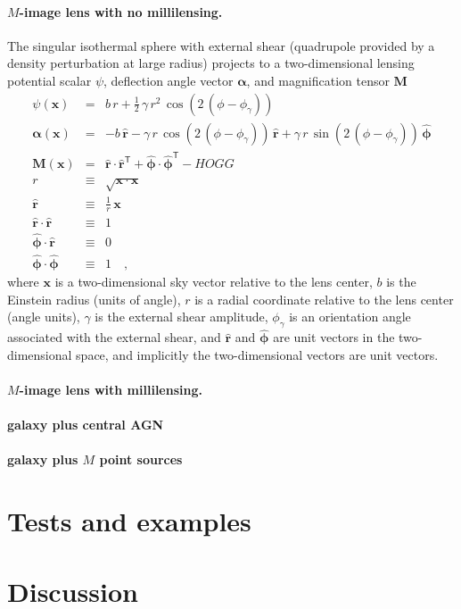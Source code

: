 \documentclass[12pt]{article}
\renewcommand{\vector}[1]{\boldsymbol{#1}}
\newcommand{\unitvector}[1]{\vector{\hat{#1}}}
\newcommand{\tensor}[1]{\boldsymbol{#1}}
\newcommand{\transpose}[1]{{#1}^{\mathsf{\!T}}}
\renewcommand{\outer}[2]{{#1}\cdot\transpose{#2}}
\newcommand{\deflection}{\vector{\alpha}}
\newcommand{\dposition}{\vector{x}}
\newcommand{\magnification}{\tensor{M}}
\newcommand{\phihat}{\unitvector{\phi}}
\newcommand{\potential}{\psi}
\newcommand{\rhat}{\unitvector{r}}
\begin{document}
\paragraph{$M$-image lens with no millilensing.}
The singular isothermal sphere with external shear (quadrupole
provided by a density perturbation at large radius) projects to a
two-dimensional lensing potential scalar $\potential$, deflection
angle vector $\deflection$, and magnification tensor $\magnification$
\begin{eqnarray}\displaystyle
\potential(\dposition) &=& b\,r + \frac{1}{2}\,\gamma\,r^2\,\cos(2\,(\phi-\phi_\gamma))
\\
\deflection(\dposition) &=& -b\,\rhat
 - \gamma\,r\,\cos(2\,(\phi-\phi_\gamma))\,\rhat
 + \gamma\,r\,\sin(2\,(\phi-\phi_\gamma))\,\phihat
\\
\magnification(\dposition) &=& \outer{\rhat}{\rhat} + \outer{\phihat}{\phihat} - HOGG
\\
r &\equiv& \sqrt{\dposition\cdot\dposition}
\\
\rhat &\equiv& \frac{1}{r}\,\dposition
\\
\rhat\cdot\rhat &\equiv& 1
\\
\phihat\cdot\rhat &\equiv& 0
\\
\phihat\cdot\phihat &\equiv& 1
\quad ,
\end{eqnarray}
where $\dposition$ is a two-dimensional sky vector relative to the
lens center, $b$ is the Einstein radius (units of angle), $r$ is a
radial coordinate relative to the lens center (angle units), $\gamma$
is the external shear amplitude, $\phi_\gamma$ is an orientation angle
associated with the external shear, and $\rhat$ and $\phihat$ are
unit vectors in the two-dimensional space, and implicitly the
two-dimensional vectors are unit vectors.

\paragraph{$M$-image lens with millilensing.}

\paragraph{galaxy plus central AGN}

\paragraph{galaxy plus $M$ point sources}

\section{Tests and examples}

\section{Discussion}
\end{document}
